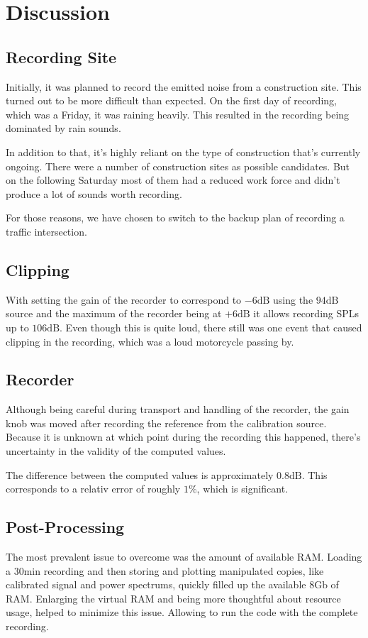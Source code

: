 \documentclass[twocolumn]{article}
\begin{document}
\section{Discussion}
\subsection{Recording Site}
Initially, it was planned to record the emitted noise from a construction site.
This turned out to be more difficult than expected.
On the first day of recording, which was a Friday, it was raining heavily.
This resulted in the recording being dominated by rain sounds.

In addition to that, it's highly reliant on the type of construction that's currently ongoing.
There were a number of construction sites as possible candidates.
But on the following Saturday most of them had a reduced work force and didn't produce a lot of sounds
worth recording.

For those reasons, we have chosen to switch to the backup plan of recording a traffic intersection.

\subsection{Clipping}
With setting the gain of the recorder to correspond to $-6 \textrm{dB}$ using the $94 \textrm{dB}$ source
and the maximum of the recorder being at $+6 \textrm{dB}$ it allows recording SPLs up to $106 \textrm{dB}$.
Even though this is quite loud, there still was one event that caused clipping in the recording,
which was a loud motorcycle passing by.


\subsection{Recorder}
\label{subsec:recorder}
Although being careful during transport and handling of the recorder, the gain knob was moved after
recording the reference from the calibration source.
Because it is unknown at which point during the recording this happened, there's uncertainty
in the validity of the computed values.

The difference between the computed values is approximately $0.8 \textrm{dB}$.
This corresponds to a relativ error of roughly $1\%$, which is significant.


\subsection{Post-Processing}
The most prevalent issue to overcome was the amount of available RAM.
Loading a $30\textrm{min}$ recording and then storing and plotting manipulated copies, like calibrated
signal and power spectrums, quickly filled up the available $8\textrm{Gb}$ of RAM.
Enlarging the virtual RAM and being more thoughtful about resource usage, helped to minimize this
issue. Allowing to run the code with the complete recording.
\end{document}
